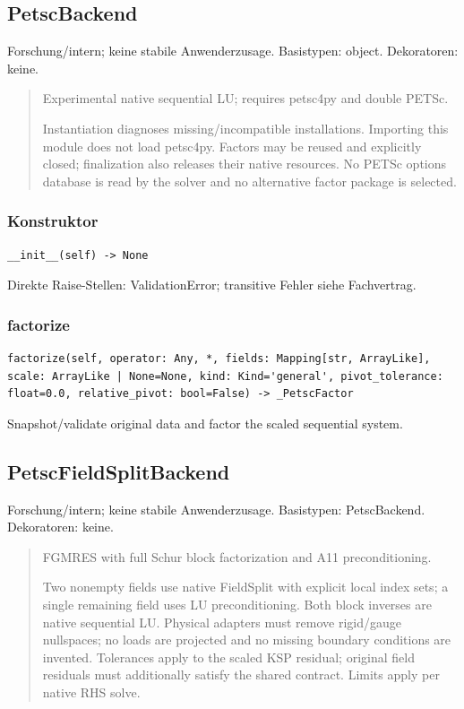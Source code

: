 \subsection{PetscBackend}
Forschung/intern; keine stabile Anwenderzusage.
Basistypen: object. Dekoratoren: keine.
\begin{quote}
Experimental native sequential LU; requires petsc4py and double PETSc.\par Instantiation diagnoses missing/incompatible installations. Importing this module does not load petsc4py. Factors may be reused and explicitly closed; finalization also releases their native resources. No PETSc options database is read by the solver and no alternative factor package is selected.
\end{quote}
\subsubsection*{Konstruktor}
\begin{lstlisting}
__init__(self) -> None
\end{lstlisting}
Direkte Raise-Stellen: ValidationError; transitive Fehler siehe Fachvertrag.
\subsubsection*{factorize}
\begin{lstlisting}
factorize(self, operator: Any, *, fields: Mapping[str, ArrayLike], scale: ArrayLike | None=None, kind: Kind='general', pivot_tolerance: float=0.0, relative_pivot: bool=False) -> _PetscFactor
\end{lstlisting}
Snapshot/validate original data and factor the scaled sequential system.
\subsection{PetscFieldSplitBackend}
Forschung/intern; keine stabile Anwenderzusage.
Basistypen: PetscBackend. Dekoratoren: keine.
\begin{quote}
FGMRES with full Schur block factorization and A11 preconditioning.\par Two nonempty fields use native FieldSplit with explicit local index sets; a single remaining field uses LU preconditioning. Both block inverses are native sequential LU. Physical adapters must remove rigid/gauge nullspaces; no loads are projected and no missing boundary conditions are invented. Tolerances apply to the scaled KSP residual; original field residuals must additionally satisfy the shared contract. Limits apply per native RHS solve.
\end{quote}
